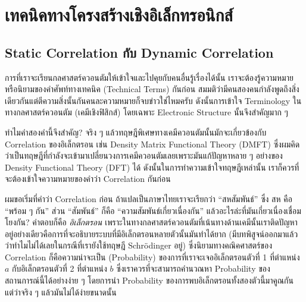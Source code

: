 

\chapter{เทคนิคทางโครงสร้างเชิงอิเล็กทรอนิกส์}
\label{ap:elec_struct_technique}

\section{Static Correlation กับ Dynamic Correlation}

การที่เราจะเรียนกลศาสตร์ควอนตัมให้เข้าใจและไปคุยกับคนอื่นรู้เรื่องได้นั้น เราจะต้องรู้ความหมายหรือนิยามของคำศัพท์ทางเทคนิค (Technical Terms)
กันก่อน สมมติว่ามีคนสองคนกำลังพูดถึงสิ่งเดียวกันแต่ตีความสิ่งนั้นกันคนละความหมายก็จบข่าวใช่ไหมครับ ดังนั้นการเข้าใจ Terminology 
ในทางกลศาสตร์ควอนตัม (เคมีเชิงฟิสิกส์) โดยเฉพาะ Electronic Structure นั้นจึงสำคัญมาก ๆ

ทำไมคำสองคำนี้จึงสำคัญ? จริง ๆ แล้วทฤษฎีพิเศษทางเคมีควอนตัมนั้นมักจะเกี่ยวข้องกับ Correlation ของอิเล็กตรอน เช่น Density Matrix 
Functional Theory (DMFT) ซึ่งผมคิดว่าเป็นทฤษฎีที่กำลังจะเข้ามาเปลี่ยนวงการเคมีควอนตัมเลยเพราะมันแก้ปัญหาหลาย ๆ อย่างของ Density 
Functional Theory (DFT) ได้ ดังนั้นในการทำความเข้าใจทฤษฎีเหล่านั้น เราก็ควรที่จะต้องเข้าใจความหมายของคำว่า Correlation กันก่อน

ผมขอเริ่มที่คำว่า Correlation ก่อน ถ้าแปลเป็นภาษาไทยเราจะเรียกว่า \enquote{สหสัมพันธ์} ซึ่ง สห คือ \enquote{พร้อม ๆ กัน} ส่วน
\enquote{สัมพันธ์} ก็คือ \enquote{ความสัมพันธ์เกี่ยวเนื่องกัน} แล้วอะไรล่ะที่มันเกี่ยวเนื่องเชื่อมโยงกัน? คำตอบก็คือ \textit{อิเล็กตรอน}
เพราะในทางกลศาสตร์ควอนตัมที่เน้นทางด้านเคมีนั้นเราติดปัญหาอยู่อย่างเดียวคือการที่จะอธิบายระบบที่มีอิเล็กตรอนหลายตัวนั้นมันทำได้ยาก 
(มีบทพิสูจน์ออกมาแล้วว่าทำไมไม่ได้เลยในกรณีที่เรายังใช้ทฤษฎี Schr\"{o}dinger อยู่) ซึ่งนิยามทางคณิคศาสตร์ของ Correlation 
ก็คือความน่าจะเป็น (Probability) ของการที่เราจะเจออิเล็กตรอนตัวที่ 1 ที่ตำแหน่ง $a$ กับอิเล็กตรอนตัวที่ 2 ที่ตำแหน่ง $b$ 
ซึ่งเราควรที่จะสามารถคำนวณหา Probability ของสถานการณ์นี้ได้อย่างง่าย ๆ โดยการนำ Probability ของการพบอิเล็กตรอนทั้งสองตัวนี้มาคูณกัน 
แต่ว่าจริง ๆ แล้วมันไม่ได้ง่ายขนาดนั้น

